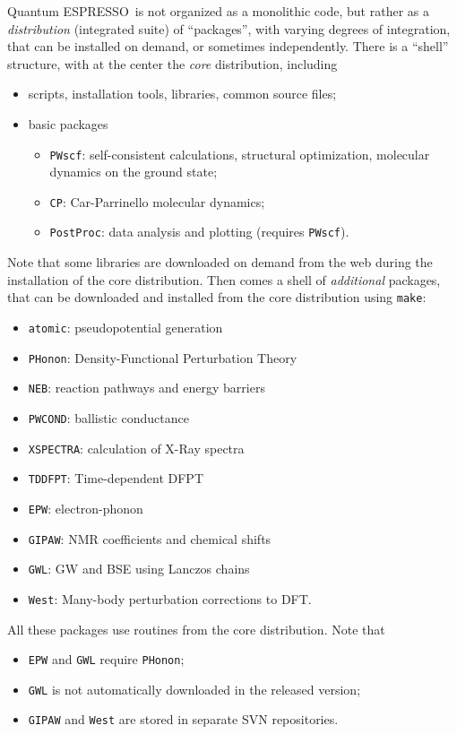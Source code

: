 \documentclass[12pt,a4paper]{article}
\def\qe{{\sc Quantum ESPRESSO}}
\begin{document}
\qe\ is not organized as a monolithic code, but rather as a
{\em distribution} (integrated suite) of ``packages'', with
varying degrees of integration, that can be installed on demand,
or sometimes independently. There is a ``shell'' structure,
with at the center the {\em core} distribution, including
\begin{itemize}
\item scripts, installation tools, libraries, common source files;
\item basic packages
\begin{itemize}
\item \texttt{PWscf}: self-consistent calculations, structural optimization,
molecular dynamics on the ground state;
\item \texttt{CP}: Car-Parrinello molecular dynamics;
\item \texttt{PostProc}: data analysis and plotting (requires \texttt{PWscf}).
\end{itemize}
\end{itemize}
Note that some libraries are downloaded on demand from the web
during the installation of the core distribution. Then comes a
shell of {\em additional} packages, that can be downloaded and
installed from the core distribution using \texttt{make}:
\begin{itemize}
\item \texttt{atomic}: pseudopotential generation
\item \texttt{PHonon}: Density-Functional Perturbation Theory
\item \texttt{NEB}: reaction pathways and energy barriers
\item \texttt{PWCOND}: ballistic conductance
\item \texttt{XSPECTRA}: calculation of X-Ray spectra
\item \texttt{TDDFPT}: Time-dependent DFPT
\item \texttt{EPW}: electron-phonon
\item \texttt{GIPAW}: NMR coefficients and chemical shifts
\item \texttt{GWL}: GW and BSE using Lanczos chains
\item \texttt{West}: Many-body perturbation corrections to DFT.
\end{itemize}
All these packages use routines from the core distribution. Note that
\begin{itemize}
\item \texttt{EPW} and \texttt{GWL} require \texttt{PHonon};
\item \texttt{GWL} is not automatically downloaded in the released version;
\item \texttt{GIPAW} and \texttt{West} are stored in separate SVN repositories.
\end{itemize}
\end{document}
